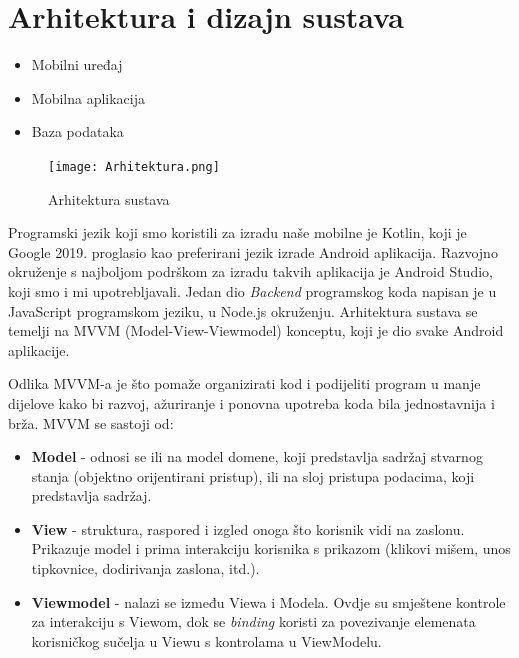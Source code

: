 \chapter{Arhitektura i dizajn sustava}
	
	\begin{itemize}
		\item Mobilni uređaj
		\item Mobilna aplikacija
		\item Baza podataka	
	\end{itemize}

	\begin{figure}[h]
		\centering
		\texttt{[image: Arhitektura.png]}
		\caption{Arhitektura sustava}
	\end{figure}



	Programski jezik koji smo koristili za izradu naše mobilne je Kotlin, koji je Google 2019. proglasio kao preferirani jezik izrade Android aplikacija. Razvojno okruženje
	s najboljom podrškom za izradu takvih aplikacija je Android Studio, koji smo i mi upotrebljavali. Jedan dio \textit{Backend} programskog koda napisan je u JavaScript programskom jeziku, 
	u Node.js okruženju. Arhitektura sustava se temelji na MVVM (Model-View-Viewmodel) konceptu, koji je dio svake Android aplikacije.

	Odlika MVVM-a je što pomaže organizirati kod i podijeliti program u manje dijelove kako bi razvoj, ažuriranje i ponovna upotreba koda bila jednostavnija i brža.
	MVVM se sastoji od:
	\begin{itemize}
		\item \textbf{Model} - odnosi se ili na model domene, koji predstavlja sadržaj stvarnog stanja (objektno orijentirani pristup), ili na sloj pristupa podacima, koji predstavlja sadržaj.
		\item \textbf{View} - struktura, raspored i izgled onoga što korisnik vidi na zaslonu. Prikazuje model i 
		prima interakciju korisnika s prikazom (klikovi mišem, unos tipkovnice, dodirivanja zaslona, itd.).
		\item \textbf{Viewmodel} - nalazi se između Viewa i Modela. Ovdje su smještene kontrole za interakciju s Viewom, dok se \textit{binding} koristi za povezivanje elemenata korisničkog sučelja
		 u Viewu s kontrolama u ViewModelu.
	\end{itemize}
	
